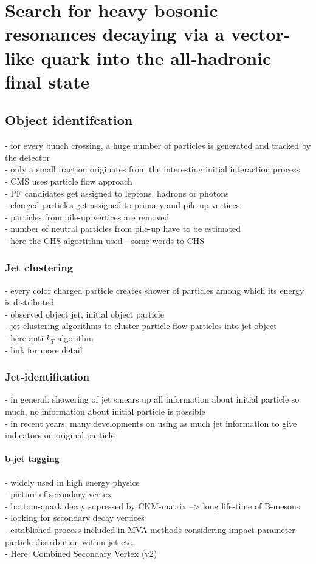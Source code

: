 \part{Search for heavy bosonic resonances decaying via a vector-like quark into the all-hadronic final state}

\chapter{Object identifcation}
- for every bunch crossing, a huge number of particles is generated and tracked by the detector\\
- only a small fraction originates from the interesting initial interaction process\\
- CMS uses particle flow approach \\
- PF candidates get assigned to leptons, hadrons or photons\\
- charged particles get assigned to primary and pile-up vertices\\
- particles from pile-up vertices are removed\\
- number of neutral particles from pile-up have to be estimated\\
- here the CHS algortithm used
- some words to CHS\\


\section{Jet clustering}
- every color charged particle creates shower of particles among which its energy is distributed\\
- observed object jet, initial object particle\\
- jet clustering algorithms to cluster particle flow particles into jet object\\
- here anti-$k_T$ algorithm\\
- link for more detail


\section{Jet-identification}
- in general: showering of jet smears up all information about initial particle so much, no information about initial particle is possible\\
- in recent years, many developments on using as much jet information to give indicators on original particle


\subsection{b-jet tagging}
- widely used in high energy physics\\
- picture of secondary vertex\\
- bottom-quark decay supressed by CKM-matrix --> long life-time of B-mesons\\
- looking for secondary decay vertices\\
- established process included in MVA-methods considering impact parameter particle distribution within jet etc.\\
- Here: Combined Secondary Vertex (v2)


